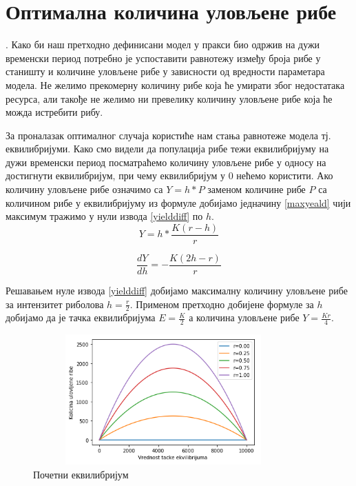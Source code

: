 \documentclass[a4paper]{article}
\begin{document}
{\section{Оптимална количина уловљене рибе}. 
\label{sec:fishingoptimum}
Како би наш претходно дефинисани модел у пракси био одржив на дужи временски период потребно је успоставити равнотежу између броја рибе у станишту и количине уловљене рибе у зависности од вредности параметара модела. Не желимо прекомерну количину рибе која ће умирати због недостатака ресурса, али такође не желимо ни превелику количину уловљене рибе која ће можда истребити рибу.

За проналазак оптималног случаја користиће нам стања равнотеже модела тј. еквилибријуми. Како смо видели да популација рибе тежи еквилибријуму на дужи временски период посматраћемо количину уловљене рибе у односу на достигнути еквилибријум, при чему еквилибријум у $0$ нећемо користити. 
Ако количину уловљене рибе означимо са $Y = h*P$ заменом количине рибе $P$ са количином рибе у еквилибријуму из формуле добијамо једначину \ref{maxyeald} чији максимум тражимо у нули извода \ref{yielddiff} по $h$.
\begin{equation}
    \label{maxyeald}
    Y = h*\frac{K(r - h) }{r}
\end{equation}

\begin{equation}
    \label{yielddiff}
     \frac{dY}{dh} = -\frac{K(2h - r) }{r}
\end{equation}

Решавањем нуле извода \ref{yielddiff} добијамо максималну количину уловљене рибе за интензитет риболова $h=\frac{r}{2}$. Применом претходно добијене формуле за $h$ добијамо да је тачка еквилибријума $E=\frac{K}{2}$ а количина уловљене рибе $Y=\frac{Kr}{4}$. 

\begin{figure}[h!]
	\centering
	\includegraphics[width=10cm,height=5.0cm]{images/OptimalHarvest.png}
	\caption{Почетни еквилибријум}
	\label{optimalHarvest}
\end{figure}


}
\end{document}
